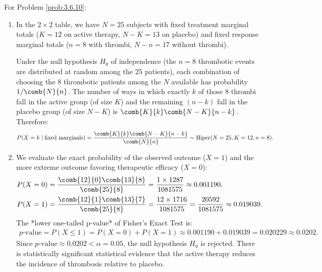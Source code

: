\begin{solucion}
	\label{sol:3.6.10}
	For Problem \ref{prob:3.6.10}:
	\begin{enumerate}
		\item In the $2 \times 2$ table, we have $N=25$ subjects with fixed treatment marginal totals ($K=12$ on active therapy, $N-K=13$ on placebo) and fixed response marginal totals ($n=8$ with thrombi, $N-n=17$ without thrombi).

		Under the null hypothesis $H_0$ of independence (the $n=8$ thrombotic events are distributed at random among the $25$ patients), each combination of choosing the $8$ thrombotic patients among the $N$ available has probability $1/\comb{N}{n}$. The number of ways in which exactly $k$ of those $8$ thrombi fall in the active group (of size $K$) and the remaining $(n-k)$ fall in the placebo group (of size $N-K$) is $\comb{K}{k}\comb{N-K}{n-k}$. Therefore:
		\begin{align*}
			P(X = k \mid \text{fixed marginals}) = \dfrac{\comb{K}{k}\comb{N-K}{n-k}}{\comb{N}{n}} \sim \text{Hiper}(N=25, K=12, n=8).
		\end{align*}
		\item We evaluate the exact probability of the observed outcome ($X=1$) and the more extreme outcome favoring therapeutic efficacy ($X=0$):
		\begin{align*}
			P(X = 0) &= \dfrac{\comb{12}{0}\comb{13}{8}}{\comb{25}{8}} = \dfrac{1 \times 1287}{1081575} \approx 0.001190. \\
			P(X = 1) &= \dfrac{\comb{12}{1}\comb{13}{7}}{\comb{25}{8}} = \dfrac{12 \times 1716}{1081575} = \dfrac{20592}{1081575} \approx 0.019039.
		\end{align*}
		The *lower one-tailed p-value* of Fisher's Exact Test is:
		\begin{align*}
			p\text{-value} = P(X \le 1) = P(X=0) + P(X=1) \approx 0.001190 + 0.019039 = 0.020229 \approx 0.0202.
		\end{align*}
		Since $p\text{-value} \approx 0.0202 < \alpha = 0.05$, the null hypothesis $H_0$ is rejected. There is statistically significant statistical evidence that the active therapy reduces the incidence of thrombosis relative to placebo.
	\end{enumerate}
\end{solucion}


